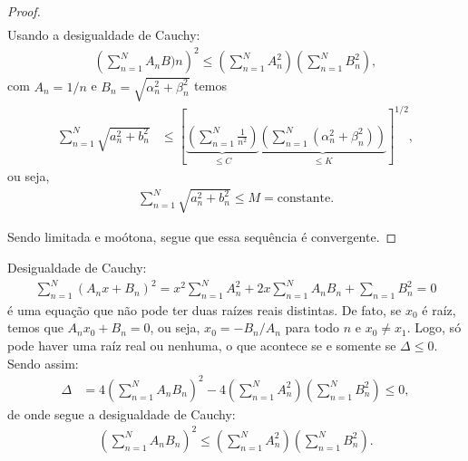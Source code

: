 \begin{proof}
\begin{align*}
    \end{align*}
    Usando a desigualdade de Cauchy:
    \begin{align*}
        \left( \sum_{n = 1}^N A_n B)n \right)^2 \leq \left( \sum_{n = 1}^N A_n^2 \right) \left( \sum_{n = 1}^N B_n^2 \right),
    \end{align*}
    com $A_n = 1 / n$ e $B_n = \sqrt{\alpha_n^2 + \beta_n^2}$ temos
    \begin{align*}
        \sum_{n = 1}^N \sqrt{a_n^2 + b_n^2} &\leq \left[ \underbrace{\left( \sum_{n = 1}^N \frac{1}{n^2} \right)}_{\leq C} \underbrace{\left( \sum_{n = 1}^N \left( \alpha_n^2 + \beta_n^2 \right) \right)}_{\leq K} \right]^{1/2},
    \end{align*}
    ou seja,
    \begin{align*}
        \sum_{n = 1}^N \sqrt{a_n^2 + b_n^2} \leq M = \text{constante}.
    \end{align*}

    Sendo limitada e mo\'{o}tona, segue que essa sequ\^{e}ncia \'{e} convergente.
\end{proof}

\begin{obs}
    Desigualdade de Cauchy:
    \begin{align*}
        \sum_{n = 1}^N \left( A_n x + B_n \right)^2 = x^2 \sum_{n = 1}^N A_n^2 + 2 x \sum_{n = 1}^N A_n B_n + \sum_{n = 1} B_n^2 = 0
    \end{align*}
    \'{e} uma equa\c{c}\~{a}o que n\~{a}o pode ter duas ra\'{i}zes reais distintas. De fato, se $x_0$ \'{e} ra\'{i}z, temos que $A_n x_0 + B_n = 0$, ou seja, $x_0 = - B_n / A_n$ para todo $n$ e $ x_0 \neq x_1$. Logo, s\'{o} pode haver uma ra\'{i}z real ou nenhuma, o que acontece se e somente se $\Delta \leq 0$. Sendo assim:
    \begin{align*}
        \Delta &= 4 \left( \sum_{n = 1}^N A_n B_n \right)^2 - 4 \left( \sum_{n = 1}^N A_n^2 \right) \left( \sum_{n = 1}^N B_n^2 \right) \leq 0,
    \end{align*}
    de onde segue a desigualdade de Cauchy:
    \begin{align*}
        \left( \sum_{n = 1}^N A_n B_n \right)^2 \leq \left( \sum_{n = 1}^N A_n^2 \right) \left( \sum_{n = 1}^N B_n^2 \right).
    \end{align*}
\end{obs}

